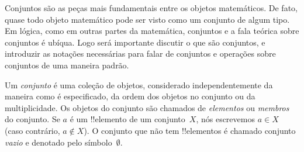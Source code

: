 \documentclass[../../../include/open-logic-section]{subfiles}
\begin{document}


\begin{explain}
Conjuntos são as peças mais fundamentais entre os objetos matemáticos.
De fato, quase todo objeto matemático pode ser visto como um 
conjunto de algum tipo. Em lógica, como em outras partes da matemática, 
conjuntos e a fala teórica sobre conjuntos é ubíqua. Logo será importante
discutir o que são conjuntos, e introduzir as notações necessárias
para falar de conjuntos e operações sobre conjuntos de uma maneira padrão.
\end{explain}

\begin{defn}[Conjunto]
Um \emph{conjunto} é uma coleção de objetos, considerado independentemente
da maneira como é especificado, da ordem dos objetos no conjunto ou
da multiplicidade. Os objetos do conjunto são chamados de \emph{elementos}
ou \emph{membros} do conjunto. Se $a$ é um !!{elemento} de um conjunto~$X$,
nós escrevemos $a \in X$ (caso contrário, $a \notin X$). O conjunto
que não tem !!{elemento}s é chamado conjunto \emph{vazio} e denotado
pelo símbolo~$\emptyset$.
\end{defn}

\end{document}
